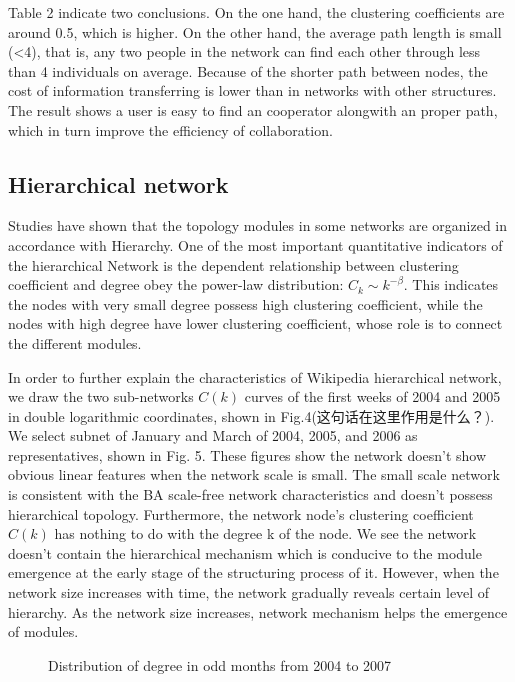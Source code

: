 \documentclass{elsarticle}
\begin{document}
Table 2 indicate two conclusions. On the one hand, the
clustering coefficients are around 0.5, which is higher. On the other
hand, the average path length is small (<4), that is, any two people
in the network can find each other through less than 4 individuals on
average. Because of the shorter path between nodes, the cost of
information transferring is lower than in
networks with other structures. The result shows a user is easy to find an cooperator
alongwith an proper path, which in turn improve the efficiency of collaboration.



 \subsection{Hierarchical network}
\label{sec:hierarchical-network}

Studies have shown that the topology modules in some networks are
organized in accordance with Hierarchy\cite{PhysRevE.67.026112,PhysRevE.65.066122}. One of the most
important quantitative indicators of the hierarchical Network is the
dependent relationship between clustering coefficient and degree obey
the power-law distribution: $C_k\sim k^{-\beta}$. This indicates the
nodes with very small degree possess high clustering coefficient,
while the nodes with high degree have lower clustering coefficient, whose role is to connect the different modules.

In order to further explain the characteristics of Wikipedia
hierarchical network, we draw the two sub-networks $C(k)$ curves of the
first weeks of 2004 and 2005 in double logarithmic coordinates, shown
in Fig.4(这句话在这里作用是什么？). We select subnet of  January and
March of 2004, 2005, and 2006  as representatives, shown in
Fig. 5. These figures show the  network doesn’t show obvious
linear features when the network scale is small. The small scale network is consistent with the
BA scale-free network characteristics and doesn’t possess hierarchical
topology. Furthermore, the network node’s clustering coefficient $C(k)$
has nothing to do with the degree k of the node. We see the  network doesn’t contain the
hierarchical mechanism which is conducive to the module emergence at
the early stage of the structuring process of it. However, when the network
size increases with time, the network gradually reveals certain level
of hierarchy. As the
network size increases, network mechanism helps the emergence of
modules. 


\begin{figure}[htpb]
  \centering
  \subfigure[ ]{
     \scalebox{0.18}{\texttt{[image: 05-1]}}
   } \quad
  \subfigure[ ]{ 
       \scalebox{0.18}{\texttt{[image: 05-2]}}
   } 
  
    \subfigure[ ]{
     \scalebox{0.18}{\texttt{[image: 05-3]}}
   } \quad
  \subfigure[ ]{ 
       \scalebox{0.18}{\texttt{[image: 05-4]}}
   } 
   
    \subfigure[ ]{
     \scalebox{0.18}{\texttt{[image: 05-5]}}
   } \quad
  \subfigure[ ]{ 
       \scalebox{0.18}{\texttt{[image: 05-6]}}
   } 
   \caption{Distribution of degree in odd months from 2004 to 2007}
\end{figure}
\end{document}
